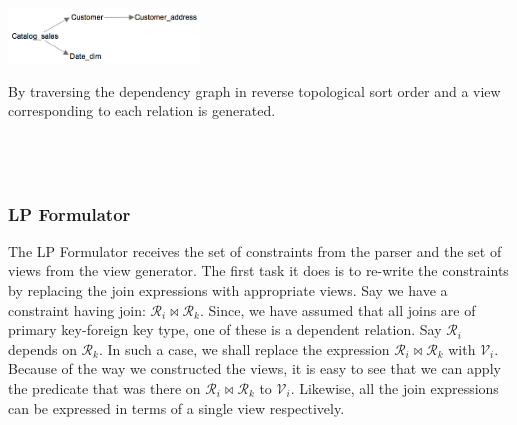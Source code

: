 \documentclass[]{article}
\newenvironment{Figure}
  {\par\medskip\noindent\minipage{\linewidth}}
  {\endminipage\par\medskip}
\begin{document}
\begin{multicols}{2}
			\begin{Figure}
				\centering
				\includegraphics[width=2in]{figures/schema_dig.png}
				\label{fig:dependency-graph}
			\end{Figure}
	
			By traversing the dependency graph in reverse topological sort order and a view corresponding to each relation is generated. 
			\\ \\
			\\ \\
	
			\subsubsection{LP Formulator}
			The LP Formulator receives the set of constraints from the parser and the set of views from the view generator. 
			The first task it does is to re-write the constraints by replacing the join expressions with appropriate views. 
			Say we have a constraint having join: $\mathcal{R}_{i} \bowtie \mathcal{R}_{k}$. 
			Since, we have assumed that all joins are of primary key-foreign key type, one of these is a dependent relation. 
			Say $\mathcal{R}_{i}$ depends on $\mathcal{R}_{k}$. 
			In such a case, we shall replace the expression $\mathcal{R}_{i} \bowtie \mathcal{R}_{k}$ with $\mathcal{V}_{i}$. 
			Because of the way we constructed the views, it is easy to see that we can apply the predicate that was there on  $\mathcal{R}_{i} \bowtie \mathcal{R}_{k}$ to $\mathcal{V}_{i}$. 
			Likewise, all the join expressions can be expressed in terms of a single view respectively.
			

\end{multicols}
\end{document}
